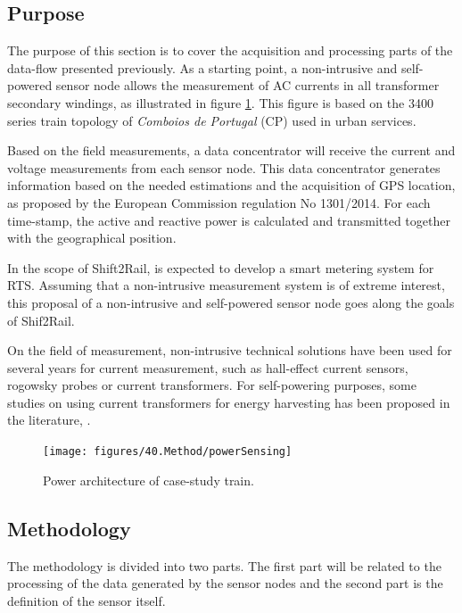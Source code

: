 \subsection{Purpose}

The purpose of this section is to cover the acquisition and processing parts of the data-flow presented previously. As a starting point, a non-intrusive and self-powered sensor node allows the measurement of AC currents in all transformer secondary windings, as illustrated in figure \ref{fig:4.powerSensing}. This figure is based on the 3400 series train topology of \textit{Comboios de Portugal} (CP) used in urban services.

Based on the field measurements, a data concentrator will receive the current and voltage measurements from each sensor node. This data concentrator generates information based on the needed estimations and the acquisition of \ac{GPS} location, as proposed by the European Commission regulation No 1301/2014. For each time-stamp, the active and reactive power is calculated and transmitted together with the geographical position.

In the scope of Shift2Rail, is expected to develop a smart metering system for \ac{RTS}. Assuming that a non-intrusive measurement system is of extreme interest, this proposal of a non-intrusive and self-powered sensor node goes along the goals of Shif2Rail.

On the field of measurement, non-intrusive technical solutions have been used for several years for current measurement, such as hall-effect current sensors, rogowsky probes or current transformers.
For self-powering purposes, some studies on using current transformers for energy harvesting has been proposed in the literature, \cite{ahola2008, wu2013, moon2015, amaro2015, brunelli2016}.


\begin{figure}[h!]
	\centering
	\vspace{-1em}
	\texttt{[image: figures/40.Method/powerSensing]}
	\caption{Power architecture of case-study train.}
	\label{fig:4.powerSensing}
\end{figure}






\subsection{Methodology}

The methodology is divided into two parts. The first part will be related to the processing of the data generated by the sensor nodes and the second part is the definition of the sensor itself.

